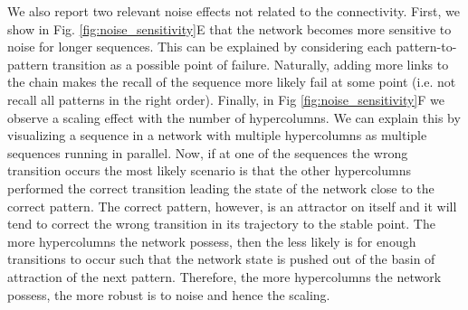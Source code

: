 \documentclass[10pt,a4paper]{article}
\begin{document}
We also report two relevant noise effects not related to the connectivity. First, we show in Fig. \ref{fig:noise_sensitivity}E that the network becomes more sensitive to noise for longer sequences. This can be explained by considering each pattern-to-pattern transition as a possible point of failure. Naturally, adding more links to the chain makes the recall of the sequence more likely fail at some point (i.e. not recall all patterns in the right order). Finally, in Fig \ref{fig:noise_sensitivity}F we observe a scaling effect with the number of hypercolumns. We can explain this by visualizing a sequence in a network with multiple hypercolumns as multiple sequences running in parallel. Now, if at one of the sequences the wrong transition occurs the most likely scenario is that the other hypercolumns performed the correct transition leading the state of the network close to the correct pattern. The correct pattern, however, is an attractor on itself and it will tend to correct the wrong transition in its trajectory to the stable point. The more hypercolumns the network possess, then the less likely is for enough transitions to occur such that the network state is pushed out of the basin of attraction of the next pattern. Therefore, the more hypercolumns the network possess, the more robust is to noise and hence the scaling. 
\end{document}
